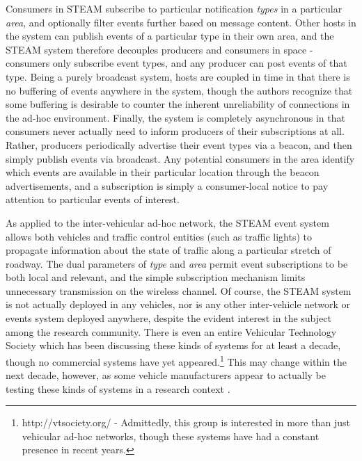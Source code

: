 \documentclass{acm_proc_article-sp}
\begin{document}
Consumers in STEAM subscribe to particular notification {\em types} in a particular {\em area}, and optionally filter events further based on message content. Other hosts in the system can publish events of a particular type in their own area, and the STEAM system therefore decouples producers and consumers in space - consumers only subscribe event types, and any producer can post events of that type. Being a purely broadcast system, hosts are coupled in time in that there is no buffering of events anywhere in the system, though the authors recognize that some buffering is desirable to counter the inherent unreliability of connections in the ad-hoc environment. Finally, the system is completely asynchronous in that consumers never actually need to inform producers of their subscriptions at all. Rather, producers periodically advertise their event types via a beacon, and then simply publish events via broadcast. Any potential consumers in the area identify which events are available in their particular location through the beacon advertisements, and a subscription is simply a consumer-local notice to pay attention to particular events of interest. 

As applied to the inter-vehicular ad-hoc network, the STEAM event system allows both vehicles and traffic control entities (such as traffic lights) to propagate information about the state of traffic along a particular stretch of roadway. The dual parameters of {\em type} and {\em area} permit event subscriptions to be both local and relevant, and the simple subscription mechanism limits unnecessary transmission on the wireless channel. Of course, the STEAM system is not actually deployed in any vehicles, nor is any other inter-vehicle network or events system deployed anywhere, despite the evident interest in the subject among the research community. There is even an entire Vehicular Technology Society which has been discussing these kinds of systems for at least a decade, though no commercial systems have yet appeared.\footnote{http://vtsociety.org/ - Admittedly, this group is interested in more than just vehicular ad-hoc networks, though these systems have had a constant presence in recent years.} This may change within the next decade, however, as some vehicle manufacturers appear to actually be testing these kinds of systems in a research context \cite{ford}.

\end{document}
